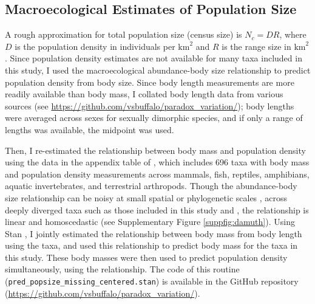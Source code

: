 \documentclass[11pt]{article}
\begin{document}
\subsection*{Macroecological Estimates of Population Size}
\label{sec:methods-popsize}

A rough approximation for total population size (census size) is $N_c = D R$,
where $D$ is the population density in individuals per $\text{km}^2$ and $R$ is
the range size in $\text{km}^2$. Since population density estimates are not
available for many taxa included in this study, I used the macroecological
abundance-body size relationship to predict population density from body size.
Since body length measurements are more readily available than body mass, I
collated body length data from various sources (see
\url{https://github.com/vsbuffalo/paradox_variation/}); body lengths were
averaged across sexes for sexually dimorphic species, and if only a range of
lengths was available, the midpoint was used.

Then, I re-estimated the relationship between body mass and population density
using the data in the appendix table of \textcite{Damuth1987-sg}, which
includes 696 taxa with body mass and population density measurements across
mammals, fish, reptiles, amphibians, aquatic invertebrates, and terrestrial
arthropods. Though the abundance-body size relationship can be noisy at small
spatial or phylogenetic scales \parencite[Chapter 5,][]{Gaston2008-pn}, across
deeply diverged taxa such as those included in this study and
\textcite{Damuth1987-sg}, the relationship is linear and homoscedastic (see
Supplementary Figure \ref{suppfig:damuth}). Using Stan
\parencite{Stan_Development_Team2020-ea}, I jointly estimated the relationship
between body mass from body length using the \textcite{Romiguier2014-bp} taxa,
and used this relationship to predict body mass for the taxa in this study.
These body masses were then used to predict population density simultaneously,
using the \textcite{Damuth1981-st} relationship. The code of this routine
(\texttt{pred\_popsize\_missing\_centered.stan}) is available in the GitHub
repository (\url{https://github.com/vsbuffalo/paradox_variation/}).
\end{document}
